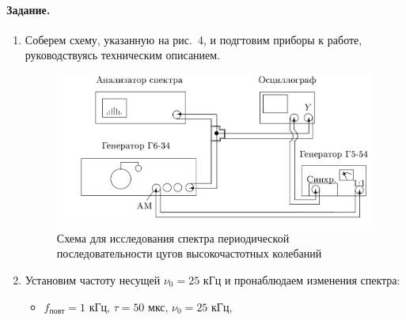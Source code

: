 \documentclass[a4paper, 12pt]{article}
\begin{document}
    \paragraph*{Задание.}

    \begin{enumerate}
        \item Соберем схему, указанную на рис.~4, и подгтовим приборы к работе, руководствуясь техническим описанием.

        \begin{figure}
            \includegraphics[scale=0.3]{pic3.png}
            \caption{Схема для исследования спектра периодической последовательности цугов высокочастотных колебаний}
        \end{figure}
        
        \item Установим частоту несущей $\nu_0 = 25$ кГц и пронаблюдаем изменения спектра:

        \begin{itemize}
            \item $f_{повт} = 1 \text{ кГц, } \tau = 50 \text{ мкс, } \nu_0 = 25 \text{ кГц, }$
            

\end{itemize}
\end{enumerate}
\end{document}
